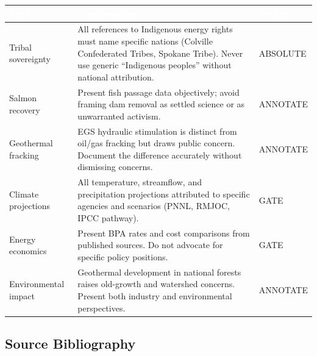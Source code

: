 \documentclass[11pt,letterpaper]{article}
\newcommand{\tableheader}[1]{\textbf{\sffamily\textcolor{white}{#1}}}
\begin{document}
\begin{center}
\begin{tabularx}{\textwidth}{L{3.5cm}XC{2cm}}
\toprule
{}
\tableheader{Topic} & \tableheader{Consideration} & \tableheader{Action} \\
\midrule
Tribal sovereignty & All references to Indigenous energy rights must name specific nations (Colville Confederated Tribes, Spokane Tribe). Never use generic ``Indigenous peoples'' without national attribution. & ABSOLUTE \\
Salmon recovery & Present fish passage data objectively; avoid framing dam removal as settled science or as unwarranted activism. & ANNOTATE \\
Geothermal fracking & EGS hydraulic stimulation is distinct from oil/gas fracking but draws public concern. Document the difference accurately without dismissing concerns. & ANNOTATE \\
Climate projections & All temperature, streamflow, and precipitation projections attributed to specific agencies and scenarios (PNNL, RMJOC, IPCC pathway). & GATE \\
Energy economics & Present BPA rates and cost comparisons from published sources. Do not advocate for specific policy positions. & GATE \\
Environmental impact & Geothermal development in national forests raises old-growth and watershed concerns. Present both industry and environmental perspectives. & ANNOTATE \\
\bottomrule
\end{tabularx}
\end{center}

\subsection{Source Bibliography}
\end{document}

